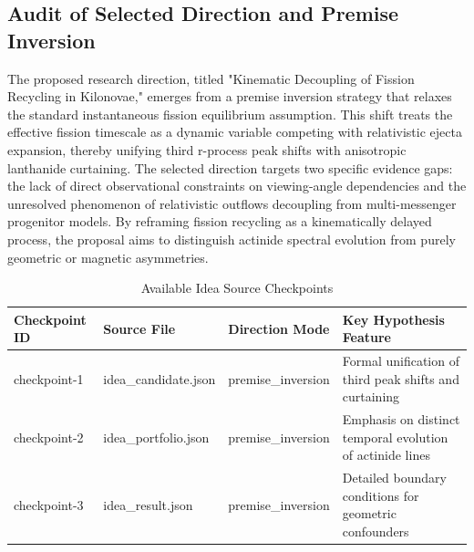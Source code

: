 \documentclass[conference]{IEEEtran}
\begin{document}
\subsection{Audit of Selected Direction and Premise Inversion}
The proposed research direction, titled "Kinematic Decoupling of Fission Recycling in Kilonovae," emerges from a premise inversion strategy that relaxes the standard instantaneous fission equilibrium assumption. This shift treats the effective fission timescale as a dynamic variable competing with relativistic ejecta expansion, thereby unifying third r-process peak shifts with anisotropic lanthanide curtaining. The selected direction targets two specific evidence gaps: the lack of direct observational constraints on viewing-angle dependencies and the unresolved phenomenon of relativistic outflows decoupling from multi-messenger progenitor models. By reframing fission recycling as a kinematically delayed process, the proposal aims to distinguish actinide spectral evolution from purely geometric or magnetic asymmetries.~\cite{cite_2bf3a687e25803e4,cite_30c88fe46f23448d}

\begin{table}[htbp]
\centering
\footnotesize
\setlength{\tabcolsep}{3pt}
\renewcommand{\arraystretch}{1.12}
\caption{Available Idea Source Checkpoints}
\label{tab:appendix-idea-evolution-checkpoint-audit-table}
\begin{tabular}{|p{}|p{}|p{}|p{}|}
\hline
Checkpoint ID & Source File & Direction Mode & Key Hypothesis Feature \\\hline
checkpoint-1 & idea\_candidate.json & premise\_inversion & Formal unification of third peak shifts and curtaining \\\hline
checkpoint-2 & idea\_portfolio.json & premise\_inversion & Emphasis on distinct temporal evolution of actinide lines \\\hline
checkpoint-3 & idea\_result.json & premise\_inversion & Detailed boundary conditions for geometric confounders \\\hline
\end{tabular}
\end{table}
\end{document}
